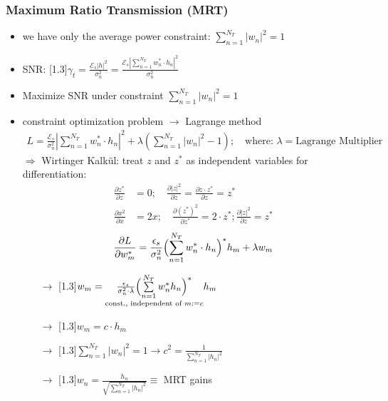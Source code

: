 \documentclass[a4paper, 10pt]{article}
\begin{document}
\subsubsection*{Maximum Ratio Transmission (MRT)}
\begin{itemize}
	\item we have only the average power constraint: $ \sum\limits_{n = 1}^{N_T} |w_n|^2 = 1 $
	\item SNR:  \scalebox{1.3}[1.3]{$\gamma	 _t = \frac{\mathcal{E}_s|h|^2}{\sigma _n^2} = \frac{\mathcal{E}_s\left|\sum\limits_{n = 1}^{N_T}w_n^*\cdot h_n \right|^2}{\sigma _n^2} $} 
	\item Maximize SNR under constraint $ \sum\limits _{n = 1}^{N_T}|w_n|^2 = 1 $
	\item constraint optimization problem $\rightarrow $ Lagrange method
		\begin{align*}
			L = \frac{\mathcal{E}_s}{\sigma _n^2}\left| \sum_{n = 1}^{N_T}w_n^*\cdot h_n \right |^2 + \lambda\left ( \sum_{n = 1}^{N_T}|w_n|^2 - 1\right ); \quad \text{where: } \lambda = \text{Lagrange Multiplier}
		\end{align*}
		$\Rightarrow$  Wirtinger Kalk\"ul: treat  $z$  and  $z^*$  as independent variables for differentiation:
		\begin{align*}
			\frac{\partial z^*}{\partial z} &= 0;\quad  \frac{\partial |z|^2}{\partial z} = \frac{\partial z\cdot z^*}{\partial z} = z^*\\
			\frac{\partial x^2}{\partial x} &= 2x; \quad \frac{\partial (z^*)^2}{\partial z^*} = 2\cdot z^*;  \frac{\partial |z|^2}{\partial z} = z^*
		\end{align*}
		\begin{align*}
			\frac{\partial L}{\partial w_m^*} = \frac{\epsilon _s}{\sigma _n^2}\Bigl ( \sum_{n = 1}^{N_T}w_n^*\cdot h_n\Bigr )^*h_m + \lambda w_m
		\end{align*}
		\begin{itemize}
			\item[$\rightarrow$] \scalebox{1.3}[1.3]{$   w_m =\underset{\text{const., independent of } m:=c}{\frac{\epsilon _s}{\sigma _n^2 \cdot \lambda}\Bigl ( \sum\limits_{n = 1}^{N_T}w_n^*h_n \Bigr )^*}h_m $}
			\item[$\rightarrow$] \scalebox{1.3}[1.3]{$  w_m = c\cdot h_m$}
			\item[$\rightarrow$] \scalebox{1.3}[1.3]{$ \sum\limits_{n = 1}^{N_T} |w_n|^2 = 1 \rightarrow c^2 = \frac{1}{\sum\limits_{n = 1}^{N_T}|h_n|^2}  $}
			\item[$\rightarrow$] \scalebox{1.3}[1.3]{$  w_n = \frac{h_n}{\sqrt{\sum\limits_{n = 1}^{N_T}|h_n|^2}} \equiv $} MRT gains 

\end{itemize}
\end{itemize}
\end{document}

